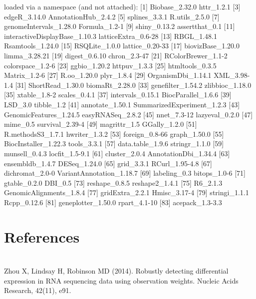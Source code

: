 \documentclass{article}
\begin{document}
\begin{Schunk}
\begin{Soutput}
loaded via a namespace (and not attached):
 [1] Biobase_2.32.0                httr_1.2.1                   
 [3] edgeR_3.14.0                  AnnotationHub_2.4.2          
 [5] splines_3.3.1                 R.utils_2.5.0                
 [7] genomeIntervals_1.28.0        Formula_1.2-1                
 [9] shiny_0.13.2                  assertthat_0.1               
[11] interactiveDisplayBase_1.10.3 latticeExtra_0.6-28          
[13] RBGL_1.48.1                   Rsamtools_1.24.0             
[15] RSQLite_1.0.0                 lattice_0.20-33              
[17] biovizBase_1.20.0             limma_3.28.21                
[19] digest_0.6.10                 chron_2.3-47                 
[21] RColorBrewer_1.1-2            colorspace_1.2-6             
[23] ggbio_1.20.2                  httpuv_1.3.3                 
[25] htmltools_0.3.5               Matrix_1.2-6                 
[27] R.oo_1.20.0                   plyr_1.8.4                   
[29] OrganismDbi_1.14.1            XML_3.98-1.4                 
[31] ShortRead_1.30.0              biomaRt_2.28.0               
[33] genefilter_1.54.2             zlibbioc_1.18.0              
[35] xtable_1.8-2                  scales_0.4.1                 
[37] intervals_0.15.1              BiocParallel_1.6.6           
[39] LSD_3.0                       tibble_1.2                   
[41] annotate_1.50.1               SummarizedExperiment_1.2.3   
[43] GenomicFeatures_1.24.5        easyRNASeq_2.8.2             
[45] nnet_7.3-12                   lazyeval_0.2.0               
[47] mime_0.5                      survival_2.39-4              
[49] magrittr_1.5                  GGally_1.2.0                 
[51] R.methodsS3_1.7.1             hwriter_1.3.2                
[53] foreign_0.8-66                graph_1.50.0                 
[55] BiocInstaller_1.22.3          tools_3.3.1                  
[57] data.table_1.9.6              stringr_1.1.0                
[59] munsell_0.4.3                 locfit_1.5-9.1               
[61] cluster_2.0.4                 AnnotationDbi_1.34.4         
[63] ensembldb_1.4.7               DESeq_1.24.0                 
[65] grid_3.3.1                    RCurl_1.95-4.8               
[67] dichromat_2.0-0               VariantAnnotation_1.18.7     
[69] labeling_0.3                  bitops_1.0-6                 
[71] gtable_0.2.0                  DBI_0.5                      
[73] reshape_0.8.5                 reshape2_1.4.1               
[75] R6_2.1.3                      GenomicAlignments_1.8.4      
[77] gridExtra_2.2.1               Hmisc_3.17-4                 
[79] stringi_1.1.1                 Rcpp_0.12.6                  
[81] geneplotter_1.50.0            rpart_4.1-10                 
[83] acepack_1.3-3.3              
\end{Soutput}
\end{Schunk}

\section{References}
\paragraph{} \hspace{0pt} \\
Zhou X, Lindsay H, Robinson MD (2014). Robustly detecting differential expression in RNA sequencing data using observation weights. Nucleic Acids Research, 42(11), e91.
\end{document}
